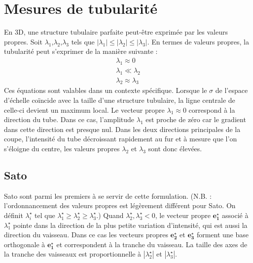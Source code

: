 \section{Mesures de tubularité}
En 3D, une structure tubulaire parfaite peut-être exprimée par les valeurs propres. Soit $\lambda_1$,$\lambda_2$,$\lambda_3$ tels que $|\lambda_1| \leq |\lambda_2| \leq |\lambda_3|$.  En termes de valeurs propres, la tubularité peut s'exprimer de la manière suivante \cite{Lorenz1997_multi} :
\begin{align}
  \lambda_1 \approx 0 \\
  \lambda_1 \ll \lambda_2 \\
  \lambda_2 \approx \lambda_3
\end{align}
Ces équations sont valables dans un contexte spécifique. Lorsque le $\sigma$ de l'espace d'échelle coïncide avec la taille d'une structure tubulaire, la ligne centrale de celle-ci devient un maximum local. Le vecteur propre $\lambda_1 \approx 0$ correspond à la direction du tube. Dans ce cas, l'amplitude $\lambda_1$ est proche de zéro car le gradient dans cette direction est presque nul. Dans les deux directions principales de la coupe, l'intensité du tube décroissant rapidement au fur et à mesure que l'on s'éloigne du centre, les valeurs propres $\lambda_2$ et $\lambda_3$ sont donc élevées.

\subsection{Sato}

Sato \etal \cite{Sato1998_vesselness} sont parmi les premiers à se servir de cette formulation. (N.B. : l'ordonnancement des valeurs propres est légèrement différent pour Sato. On définit $\lambda^\star_i$ tel que $\lambda^\star_1 \geqslant \lambda^\star_2  \geqslant  \lambda^\star_3$.)
Quand $\lambda^\star_2, \lambda^\star_3 < 0$, le vecteur propre $\mathbf {e^\star_1}$ associé à $\lambda^\star_1$ pointe dans la direction de la plus petite variation d'intensité, qui est aussi la direction du vaisseau.
Dans ce cas les vecteurs propres $\mathbf {e^\star_2}$ et $\mathbf {e^\star_3}$ forment une base orthogonale à $\mathbf {e^\star_1}$ et correspondent à la tranche du vaisseau.
La taille des axes de la tranche des vaisseaux est proportionnelle à $|\lambda^\star_2|$ et $|\lambda^\star_3|$.

